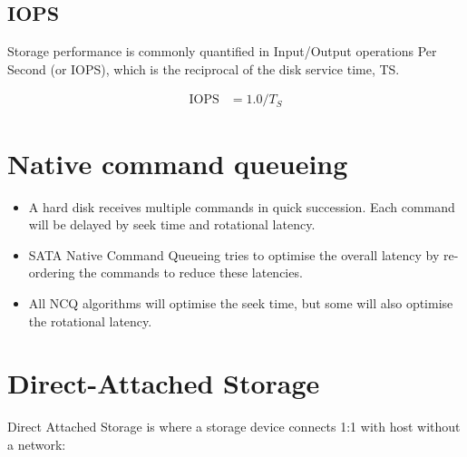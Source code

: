 \documentclass[slides]{pgnotes}
\begin{document}
\subsection{IOPS}
\label{sec:iops}

Storage performance is commonly quantified in Input/Output operations
Per Second (or IOPS), which is the reciprocal of the disk service time,
TS.

\begin{align}
  \mbox{IOPS} & = 1.0 / T_S \label{eq:ts-to-iops}
\end{align}

\section{Native command queueing}
\label{sec:native-command-queueing}

\begin{minipage}{0.5\linewidth}
  \begin{itemize}
  \item A hard disk receives multiple commands in quick succession. Each command will be delayed by seek time and rotational latency.
  \item SATA Native Command Queueing tries to optimise the overall latency by  re-ordering the commands to reduce these latencies.
  \item All NCQ algorithms will optimise the seek time, but some will also optimise the rotational latency.
  \end{itemize}
\end{minipage}
\begin{minipage}{0.4\linewidth}
\end{minipage}

\section{Direct-Attached Storage}
\label{sec:direct-attached-storage}

Direct Attached Storage is where a storage device connects 1:1 with host
without a network:
\end{document}
